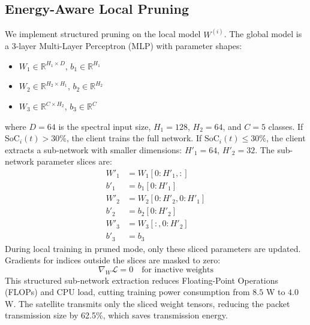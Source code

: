 \documentclass[journal,twocolumn]{IEEEtran}
\begin{document}
\subsection{Energy-Aware Local Pruning}
We implement structured pruning on the local model $W^{(i)}$. The global model is a 3-layer Multi-Layer Perceptron (MLP) with parameter shapes:
\begin{itemize}
    \item $W_1 \in \mathbb{R}^{H_1 \times D}$, $b_1 \in \mathbb{R}^{H_1}$
    \item $W_2 \in \mathbb{R}^{H_2 \times H_1}$, $b_2 \in \mathbb{R}^{H_2}$
    \item $W_3 \in \mathbb{R}^{C \times H_2}$, $b_3 \in \mathbb{R}^{C}$
\end{itemize}
where $D = 64$ is the spectral input size, $H_1 = 128$, $H_2 = 64$, and $C = 5$ classes.
If $\text{SoC}_i(t) > 30\%$, the client trains the full network.
If $\text{SoC}_i(t) \le 30\%$, the client extracts a sub-network with smaller dimensions: $H'_1 = 64$, $H'_2 = 32$. The sub-network parameter slices are:
\begin{align}
    W'_1 &= W_1[0:H'_1, :] \\
    b'_1 &= b_1[0:H'_1] \\
    W'_2 &= W_2[0:H'_2, 0:H'_1] \\
    b'_2 &= b_2[0:H'_2] \\
    W'_3 &= W_3[:, 0:H'_2] \\
    b'_3 &= b_3
\end{align}
During local training in pruned mode, only these sliced parameters are updated. Gradients for indices outside the slices are masked to zero:
\begin{equation}
    \nabla_{W} \mathcal{L} = 0 \quad \text{for inactive weights}
\end{equation}
This structured sub-network extraction reduces Floating-Point Operations (FLOPs) and CPU load, cutting training power consumption from $8.5$ W to $4.0$ W. The satellite transmits only the sliced weight tensors, reducing the packet transmission size by 62.5\%, which saves transmission energy.
\end{document}
